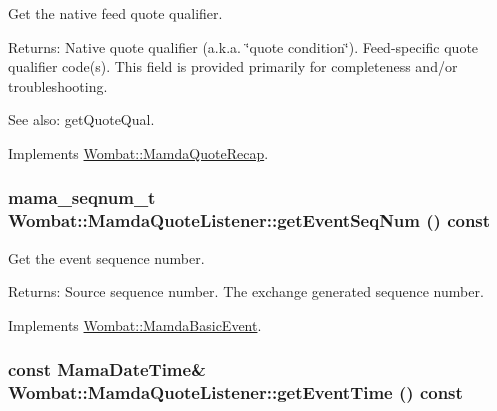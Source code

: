 Get the native feed quote qualifier. 

\begin{Desc}
\item[Returns:]Native quote qualifier (a.k.a. \char`\"{}quote condition\char`\"{}). Feed-specific quote qualifier code(s). This field is provided primarily for completeness and/or troubleshooting. \end{Desc}
\begin{Desc}
\item[See also:]get\-Quote\-Qual. \end{Desc}


Implements \hyperlink{classWombat_1_1MamdaQuoteRecap_79543d52d9809abd98abfce3fe4e29e9}{Wombat::Mamda\-Quote\-Recap}.\hypertarget{classWombat_1_1MamdaQuoteListener_fa0883ea81d5b2286d1014616407b690}{
\subsubsection[getEventSeqNum]{\setlength{\rightskip}{0pt plus 5cm}mama\_\-seqnum\_\-t Wombat::Mamda\-Quote\-Listener::get\-Event\-Seq\-Num () const}}
\label{classWombat_1_1MamdaQuoteListener_fa0883ea81d5b2286d1014616407b690}


Get the event sequence number. 

\begin{Desc}
\item[Returns:]Source sequence number. The exchange generated sequence number. \end{Desc}


Implements \hyperlink{classWombat_1_1MamdaBasicEvent_1fd845d48e95b4ee3beafc72d1ac2adf}{Wombat::Mamda\-Basic\-Event}.\hypertarget{classWombat_1_1MamdaQuoteListener_3d5fbd8aa814552de16c665b3eca1dfc}{
\subsubsection[getEventTime]{\setlength{\rightskip}{0pt plus 5cm}const Mama\-Date\-Time\& Wombat::Mamda\-Quote\-Listener::get\-Event\-Time () const}}
\label{classWombat_1_1MamdaQuoteListener_3d5fbd8aa814552de16c665b3eca1dfc}


